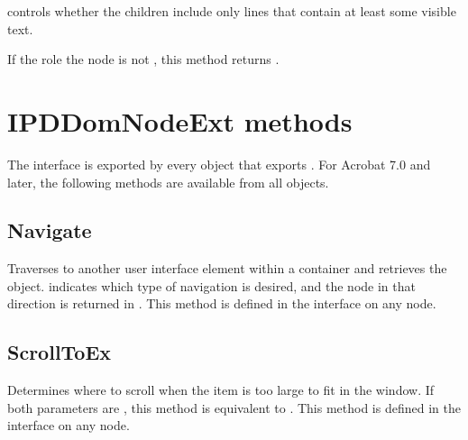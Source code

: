 \documentclass[letterpaper,12pt,english,openany,oneside]{sphinxmanual}
\begin{document}
 controls whether the children include only lines that contain at least some visible text.

If the role the node is not  , this method returns  .

\begin{sphinxVerbatim}[commandchars=\\\{\}]
      
\end{sphinxVerbatim}




\section{IPDDomNodeExt methods}
\label{\detokenize{Access_DOM:ipddomnodeext-methods}}
The  interface is exported by every object that exports  . For Acrobat 7.0 and later, the following methods are available from all objects.


\subsection{Navigate}
\label{\detokenize{Access_DOM:navigate}}
Traverses to another user interface element within a container and retrieves the object.  indicates which type of navigation is desired, and the node in that direction is returned in  . This method is defined in the  interface on any node.

\begin{sphinxVerbatim}[commandchars=\\\{\}]
 
 
 
\end{sphinxVerbatim}


\subsection{ScrollToEx}
\label{\detokenize{Access_DOM:scrolltoex}}
Determines where to scroll when the item is too large to fit in the window. If both parameters are  , this method is equivalent to  . This method is defined in the  interface on any node.
\end{document}
